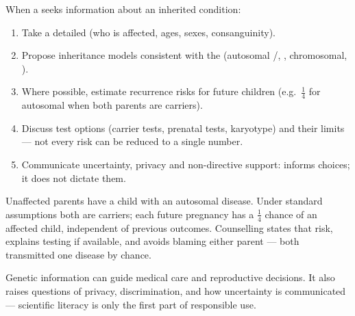 \begin{method}
\label{met:g11:human-genetics:counselling}
When a  seeks information about an inherited condition:
\begin{enumerate}
  \item Take a detailed  (who is affected, ages, sexes, consanguinity).
  \item Propose inheritance models consistent with the  (autosomal
        /, , chromosomal, ).
  \item Where possible, estimate recurrence risks for future children (e.g.\
        $\tfrac14$ for autosomal  when both parents are carriers).
  \item Discuss test options (carrier tests, prenatal tests, karyotype) and
        their limits --- not every risk can be reduced to a single number.
  \item Communicate uncertainty, privacy and non-directive support: 
        informs choices; it does not dictate them.
\end{enumerate}
\end{method}

\begin{example}
\label{ex:g11:human-genetics:counsel}
Unaffected parents have a child with an autosomal  disease. Under
standard assumptions both are carriers; each future pregnancy has a
$\tfrac14$ chance of an affected child, independent of previous outcomes.
Counselling states that risk, explains testing if available, and avoids
blaming either parent --- both transmitted one disease  by chance.
\end{example}

\begin{remark}
Genetic information can guide medical care and reproductive decisions. It also
raises questions of privacy, discrimination, and how uncertainty is communicated
--- scientific literacy is only the first part of responsible use.
\end{remark}

